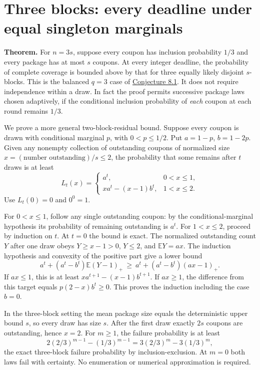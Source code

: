 \documentclass[11pt]{article}
\begin{document}
\section*{Three blocks: every deadline under equal singleton
marginals}\label{three-blocks-every-deadline-under-equal-singleton-marginals}

\textbf{Theorem.} For \(n=3s\), suppose every coupon has inclusion
probability \(1/3\) and every package has at most \(s\) coupons. At
every integer deadline, the probability of complete coverage is bounded
above by that for three equally likely disjoint \(s\)-blocks. This is
the balanced \(q=3\) case of
\href{https://hexagonmath.org/pdf/2611.00814v1}{Conjecture 8.1}. It does
not require independence within a draw. In fact the proof permits
successive package laws chosen adaptively, if the conditional inclusion
probability of \emph{each} coupon at each round remains \(1/3\).

We prove a more general two-block-residual bound. Suppose every coupon
is drawn with conditional marginal \(p\), with \(0<p\le1/2\). Put
\(a=1-p\), \(b=1-2p\). Given any nonempty collection of outstanding
coupons of normalized size \(x=(\text{number outstanding})/s\le2\), the
probability that some remains after \(t\) draws is at least \[
 L_t(x)=
 \begin{cases}
 a^t,&0<x\le1,\\
 xa^t-(x-1)b^t,&1<x\le2.
 \end{cases}
\] Use \(L_t(0)=0\) and \(0^0=1\).

For \(0<x\le1\), follow any single outstanding coupon: by the
conditional-marginal hypothesis its probability of remaining outstanding
is \(a^t\). For \(1<x\le2\), proceed by induction on \(t\). At \(t=0\)
the bound is exact. The normalized outstanding count \(Y\) after one
draw obeys \(Y\ge x-1>0\), \(Y\le2\), and \(\mathbb E Y=ax\). The
induction hypothesis and convexity of the positive part give a lower
bound \[
 a^t+(a^t-b^t)\mathbb E(Y-1)_+
 \ \ge\ a^t+(a^t-b^t)(ax-1)_+.
\] If \(ax\le1\), this is at least \(xa^{t+1}-(x-1)b^{t+1}\). If
\(ax\ge1\), the difference from this target equals \(p(2-x)b^t\ge0\).
This proves the induction including the case \(b=0\).

In the three-block setting the mean package size equals the
deterministic upper bound \(s\), so every draw has size \(s\). After the
first draw exactly \(2s\) coupons are outstanding, hence \(x=2\). For
\(m\ge1\), the failure probability is at least \[
 2(2/3)^{m-1}-(1/3)^{m-1}
 =3(2/3)^m-3(1/3)^m,
\] the exact three-block failure probability by inclusion-exclusion. At
\(m=0\) both laws fail with certainty. No enumeration or numerical
approximation is required.
\end{document}
